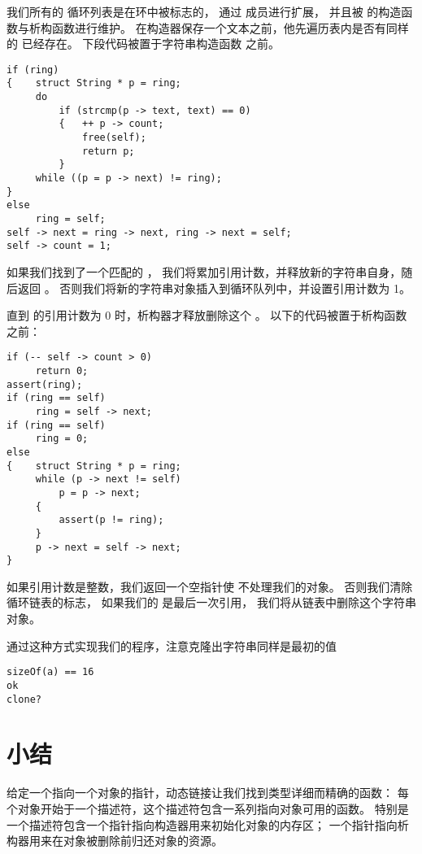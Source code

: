 我们所有的  循环列表是在环中被标志的，
通过  成员进行扩展，
并且被  的构造函数与析构函数进行维护。
在构造器保存一个文本之前，他先遍历表内是否有同样的  已经存在。
下段代码被置于字符串构造函数  之前。
\begin{lstlisting}
if (ring)
{    struct String * p = ring;
     do
         if (strcmp(p -> text, text) == 0)
         {   ++ p -> count;
             free(self);
             return p;
         }
     while ((p = p -> next) != ring);
}
else
     ring = self;
self -> next = ring -> next, ring -> next = self;
self -> count = 1;
\end{lstlisting}

如果我们找到了一个匹配的 ，
我们将累加引用计数，并释放新的字符串自身，随后返回 。
否则我们将新的字符串对象插入到循环队列中，并设置引用计数为 1。

直到  的引用计数为 0 时，析构器才释放删除这个 。
以下的代码被置于析构函数  之前：
\begin{lstlisting}
if (-- self -> count > 0)
     return 0;
assert(ring);
if (ring == self)
     ring = self -> next;
if (ring == self)
     ring = 0;
else
{    struct String * p = ring;
     while (p -> next != self)
         p = p -> next;
     {
         assert(p != ring);
     }
     p -> next = self -> next;
}
\end{lstlisting}

如果引用计数是整数，我们返回一个空指针使
 不处理我们的对象。
否则我们清除循环链表的标志，
如果我们的  是最后一次引用，
我们将从链表中删除这个字符串对象。

通过这种方式实现我们的程序，注意克隆出字符串同样是最初的值 %
\begin{lstlisting}
sizeOf(a) == 16
ok
clone?
\end{lstlisting}

\section{小结}
\label{sec:dlSum}

给定一个指向一个对象的指针，动态链接让我们找到类型详细而精确的函数：
每个对象开始于一个描述符，这个描述符包含一系列指向对象可用的函数。
特别是一个描述符包含一个指针指向构造器用来初始化对象的内存区；
一个指针指向析构器用来在对象被删除前归还对象的资源。

